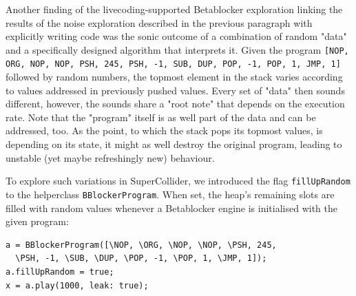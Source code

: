 \documentclass[letterpaper, 12pt]{article}
\begin{document}
Another finding of the livecoding-supported Betablocker exploration linking the results of the noise exploration described in the previous paragraph with explicitly writing code
was the sonic outcome of a combination of random "data" and a specifically designed algorithm that interprets it.
Given the program
\texttt{[NOP, ORG, NOP, NOP, PSH, 245, PSH, -1, SUB, DUP, POP, -1, POP, 1, JMP, 1]} 
followed by random numbers, the topmost element in the stack varies according to values addressed in previously pushed values.
Every set of "data" then sounds different, however, the sounds share a "root note" that depends on the execution rate.
Note that the "program" itself is as well part of the data and can be addressed, too.
As the point, to which the stack pops its topmost values, is depending on its state, it might as well destroy the original program, leading to unstable (yet maybe refreshingly new) behaviour.

To explore such variations in SuperCollider, we introduced the flag \texttt{fillUpRandom} to the helperclass \texttt{BBlockerProgram}.
When set, the heap's remaining slots are filled with random values whenever a Betablocker engine is initialised with the given program:

\begin{Verbatim}[fontfamily=courier, xleftmargin=\parindent]
a = BBlockerProgram([\NOP, \ORG, \NOP, \NOP, \PSH, 245, 
  \PSH, -1, \SUB, \DUP, \POP, -1, \POP, 1, \JMP, 1]);
a.fillUpRandom = true;
x = a.play(1000, leak: true);
\end{Verbatim}
\end{document}
